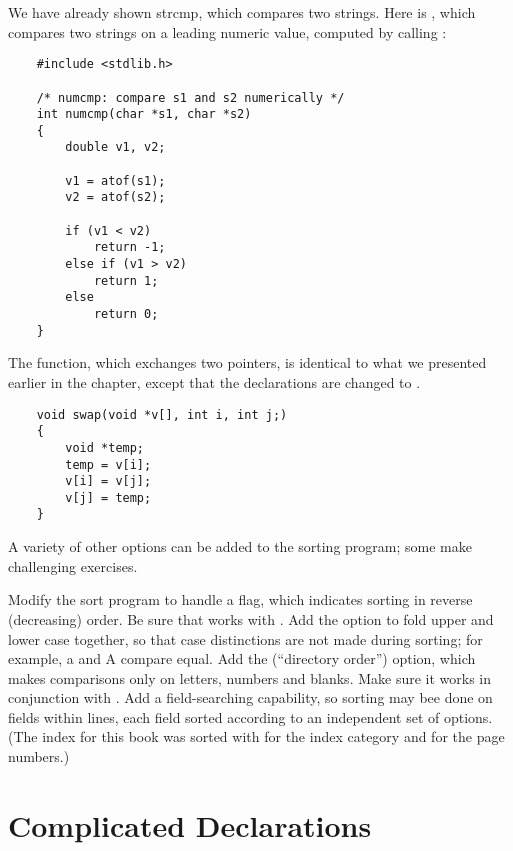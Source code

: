 We have already shown strcmp, which compares two strings.
Here is , which compares two strings on a leading numeric value, computed by calling :

\begin{lstlisting}
    #include <stdlib.h>

    /* numcmp: compare s1 and s2 numerically */
    int numcmp(char *s1, char *s2)
    {
        double v1, v2;

        v1 = atof(s1);
        v2 = atof(s2);

        if (v1 < v2)
            return -1;
        else if (v1 > v2)
            return 1;
        else
            return 0;
    }
\end{lstlisting}

The  function, which exchanges two pointers, is identical to what we presented earlier in the chapter, except that the declarations are changed to .

\begin{lstlisting}
    void swap(void *v[], int i, int j;)
    {
        void *temp;
        temp = v[i];
        v[i] = v[j];
        v[j] = temp;
    }
\end{lstlisting}

A variety of other options can be added to the sorting program; some make challenging exercises.
\newline

\begin{ExerciseList}
\Exercise Modify the sort program to handle a  flag, which indicates sorting in reverse (decreasing) order. Be sure that  works with .
\Exercise Add the option  to fold upper and lower case together, so that case distinctions are not made during sorting; for example, a and A compare equal.
\Exercise Add the  (``directory order'') option, which makes comparisons only on letters, numbers and blanks. Make sure it works in conjunction with .
\Exercise Add a field-searching capability, so sorting may bee done on fields within lines, each field sorted according to an independent set of options.
(The index for this book was sorted with  for the index category and  for the page numbers.)
\end{ExerciseList}



\section{Complicated Declarations}


